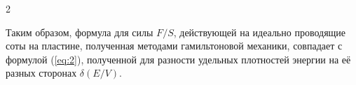 \documentclass[twoside, 10pt]{article}
\begin{document}
\begin{multicols}{2}

    Таким образом, формула для силы \({F}/{S}\), действующей на идеально проводящие соты на пластине, полученная методами гамильтоновой механики, совпадает с формулой (\ref{eq:2}), полученной для разности удельных плотностей энергии на её разных сторонах \(\delta\left({E}/{V}\right)\).




\end{multicols}
\end{document}
